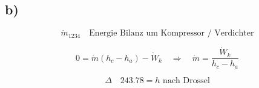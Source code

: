 

\subsection*{b)}

\[
\dot{m}_{1234} \quad \text{Energie Bilanz um Kompressor / Verdichter}
\]

\[
0 = \dot{m} (h_c - h_a) - \dot{W}_k \quad \Rightarrow \quad \dot{m} = \frac{\dot{W}_k}{h_c - h_a}
\]

\[
\Delta \quad 243.78 = h \text{ nach Drossel}
\]